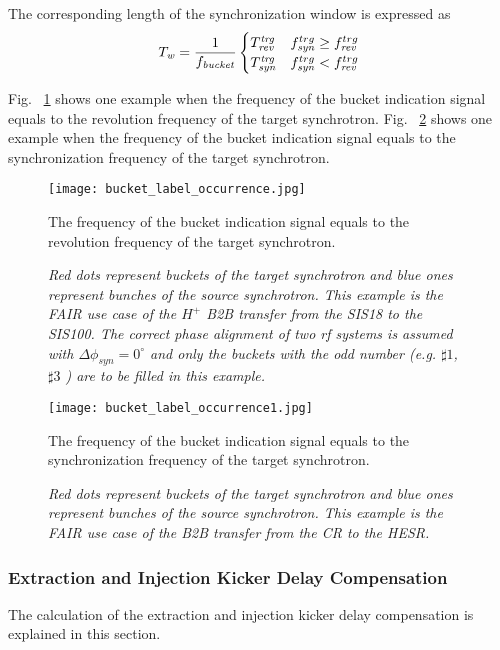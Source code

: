 The corresponding length of the synchronization window is expressed as
\begin{eqnarray}
T_\mathit{w}=\frac{1}{f_\mathit{bucket}}
\begin{cases}
T_\mathit{rev}^\mathit{trg} &f_{\mathit{syn}}^{trg}\ge f_{\mathit{rev}}^{trg}\cr

T_\mathit{syn}^\mathit{trg}
&f_{\mathit{syn}}^{trg}<f_{\mathit{rev}}^{trg}
\end{cases}
\end{eqnarray}


Fig. ~\ref{bucket_label_occurrence} shows one example when the frequency of the bucket indication signal equals to the revolution frequency of the target synchrotron. Fig. ~\ref{bucket_label_occurrence1} shows one example when the frequency of the bucket indication signal equals to the synchronization frequency of the target synchrotron. 
\begin{figure}[!htb]
   \centering   
   \texttt{[image: bucket\_label\_occurrence.jpg]}
   \caption{The frequency of the bucket indication signal equals to the revolution frequency of the target synchrotron.}
	\caption*{\textsl{\small{Red dots represent buckets of the target synchrotron and blue ones represent bunches of the source synchrotron. This example is the FAIR use case of the $H^+$ B2B transfer from the SIS18 to the SIS100. The correct phase alignment of two rf systems is assumed with $\Delta\phi_\mathit{syn}=0^\circ$ and only the buckets with the odd number (e.g. $\sharp1$, $\sharp3$ ) are to be filled in this example.}}}
   \label{bucket_label_occurrence}
\end{figure}

\begin{figure}[!htb]
   \centering   
   \texttt{[image: bucket\_label\_occurrence1.jpg]}
   \caption{The frequency of the bucket indication signal equals to the synchronization frequency of the target synchrotron.}
	\caption*{\textsl{\small{Red dots represent buckets of the target synchrotron and blue ones represent bunches of the source synchrotron. This example is the FAIR use case of the B2B transfer from the CR to the HESR. }}}
   \label{bucket_label_occurrence1}
\end{figure}



\subsubsection{Extraction and Injection Kicker Delay Compensation}
The calculation of the extraction and injection kicker delay compensation is explained in this section.

